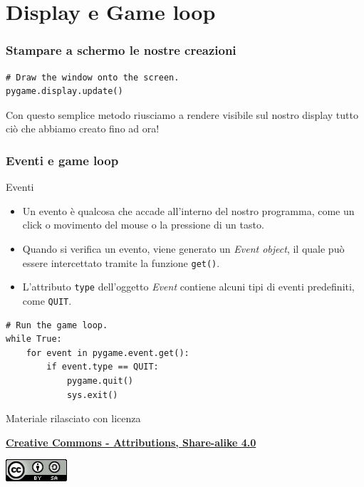 \documentclass{beamer}
\begin{document}
\section{Display e Game loop}

\begin{frame}[fragile]
\frametitle{Stampare a schermo le nostre creazioni}
\begin{lstlisting}
# Draw the window onto the screen.
pygame.display.update()
\end{lstlisting}
Con questo semplice metodo riusciamo a rendere visibile sul nostro display tutto ciò che abbiamo creato fino ad ora!
\end{frame}

\begin{frame}[fragile]
\frametitle{Eventi e game loop}
\begin{block}{Eventi}
	\begin{itemize}
		\item Un evento è qualcosa che accade all'interno del nostro programma, come un click o movimento del mouse o la pressione di un tasto.
		\item Quando si verifica un evento, viene generato un \textit{Event object}, il quale può essere intercettato tramite la funzione \texttt{get()}.
		\item L'attributo \texttt{type} dell'oggetto \textit{Event} contiene alcuni tipi di eventi predefiniti, come \texttt{QUIT}.
	\end{itemize}
\end{block}
\begin{lstlisting}
# Run the game loop.
while True:
    for event in pygame.event.get():
        if event.type == QUIT:
            pygame.quit()
            sys.exit()
\end{lstlisting}
\end{frame}

\begin{frame}

\begin{center}
	\bigskip
	Materiale rilasciato con licenza
	
	\textbf{\href{http://creativecommons.org/licenses/by-sa/4.0/}{Creative Commons - Attributions, Share-alike 4.0}}
	
	\medskip
	\includegraphics[height=0.8cm]{images/cc.jpeg}
\end{center}

\end{frame}	
\end{document}
